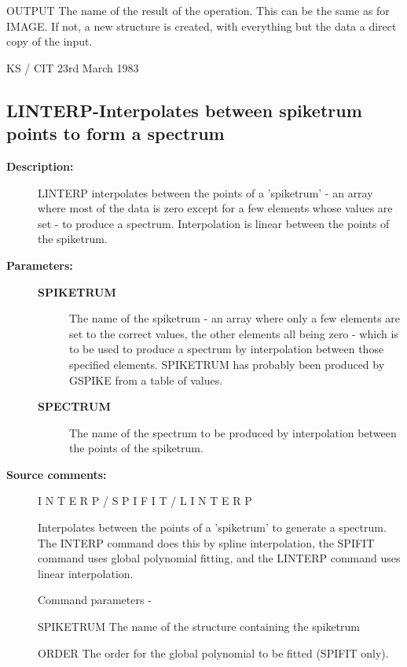 \begin{description}
\begin{description}
\begin{terminalv}
 OUTPUT The name of the result of the operation.  This can
        be the same as for IMAGE.  If not, a new structure
        is created, with everything but the data a direct
        copy of the input.

                                  KS / CIT 23rd March 1983
\end{terminalv}
\end{description}
\subsection{LINTERP-\label{LINTERP}Interpolates between spiketrum points to form a spectrum}
\begin{description}

\item [\textbf{Description:}]
 LINTERP interpolates between the points of a 'spiketrum' - an
 array where most of the data is zero except for a few elements
 whose values are set - to produce a spectrum.  Interpolation is
 linear between the points of the spiketrum.

\item [\textbf{Parameters:}]
\begin{description}
\item [\textbf{SPIKETRUM}]
 The name of the spiketrum - an array where only a
 few elements are set to the correct values, the other
 elements all being zero - which is to be used to produce
 a spectrum by interpolation between those specified
 elements.  SPIKETRUM has probably been produced by
 GSPIKE from a table of values.
\item [\textbf{SPECTRUM}]
 The name of the spectrum to be produced by
 interpolation between the points of the spiketrum.
\end{description}

\item [\textbf{Source comments:}]
\begin{terminalv}
 I N T E R P    /     S P I F I T    /   L I N T E R P

 Interpolates between the points of a 'spiketrum' to
 generate a spectrum.   The INTERP command does this by
 spline interpolation, the SPIFIT command uses global polynomial
 fitting, and the LINTERP command uses linear interpolation.

 Command parameters -

 SPIKETRUM  The name of the structure containing the spiketrum

 ORDER      The order for the global polynomial to be fitted
            (SPIFIT only).


\end{terminalv}
\end{description}
\end{description}
